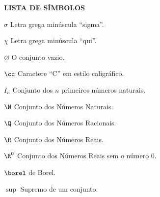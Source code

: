 \begin{center}
	\textbf{LISTA DE SÍMBOLOS}
\end{center}

\begin{description}
	\item $\sigma$ \hspace{2cm} Letra grega minúscula \enquote{sigma}.
	\item $\chi$   \hspace{2cm} Letra grega minúscula \enquote{qui}.
	\item $\varnothing$ \hspace{2cm} O conjunto vazio.
	\item $\cc$ \hspace{2cm} Caractere \enquote{C} em estilo caligráfico.
	\item $I_n$ \hspace{2cm} Conjunto dos $n$ primeiros números naturais.
	\item $\N$ \hspace{2cm} Conjunto dos Números Naturais.
	\item $\Q$ \hspace{2cm} Conjunto dos Números Racionais.
	\item $\R$ \hspace{2cm} Conjunto dos Números Reais.
	\item $\R^0$ \hspace{2cm} Conjunto dos Números Reais sem o número $0$.
	\item $\borel$ \hspace{2cm} \sigal de Borel.
	\item $\sup$ \hspace{2cm} Supremo de um conjunto.	
\end{description}
\pagebreak 